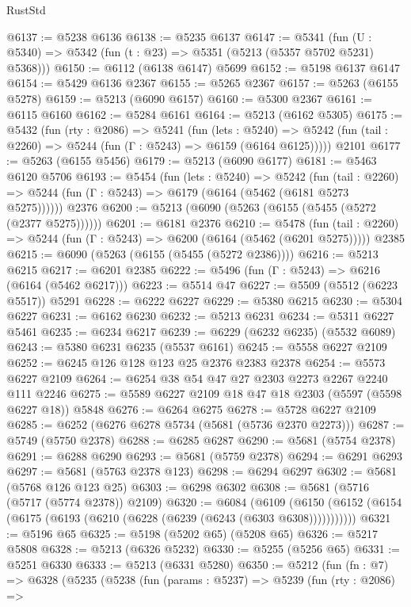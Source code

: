\begin{lexlean}{RustStd}
\begin{coremodule}
@6137 := @5238 @6136
@6138 := @5235 @6137
@6147 := @5341 (fun (U : @5340) => @5342 (fun (t : @23) => @5351 (@5213 (@5357 @5702 @5231) @5368)))
@6150 := @6112 (@6138 @6147) @5699
@6152 := @5198 @6137 @6147
@6154 := @5429 @6136 @2367
@6155 := @5265 @2367
@6157 := @5263 (@6155 @5278)
@6159 := @5213 (@6090 @6157)
@6160 := @5300 @2367
@6161 := @6115 @6160
@6162 := @5284 @6161
@6164 := @5213 (@6162 @5305)
@6175 := @5432
    (fun (rty : @2086) =>
    @5241
      (fun (lets : @5240) =>
      @5242 (fun (tail : @2260) => @5244 (fun (Γ : @5243) => @6159 (@6164 @6125)))))
    @2101
@6177 := @5263 (@6155 @5456)
@6179 := @5213 (@6090 @6177)
@6181 := @5463 @6120 @5706
@6193 := @5454
    (fun (lets : @5240) =>
    @5242
      (fun (tail : @2260) => @5244 (fun (Γ : @5243) => @6179 (@6164 (@5462 (@6181 @5273 @5275))))))
    @2376
@6200 := @5213 (@6090 (@5263 (@6155 (@5455 (@5272 (@2377 @5275))))))
@6201 := @6181 @2376
@6210 := @5478
    (fun (tail : @2260) => @5244 (fun (Γ : @5243) => @6200 (@6164 (@5462 (@6201 @5275)))))
    @2385
@6215 := @6090 (@5263 (@6155 (@5455 (@5272 @2386))))
@6216 := @5213 @6215
@6217 := @6201 @2385
@6222 := @5496 (fun (Γ : @5243) => @6216 (@6164 (@5462 @6217)))
@6223 := @5514 @47
@6227 := @5509 (@5512 (@6223 @5517)) @5291
@6228 := @6222 @6227
@6229 := @5380 @6215
@6230 := @5304 @6227
@6231 := @6162 @6230
@6232 := @5213 @6231
@6234 := @5311 @6227 @5461
@6235 := @6234 @6217
@6239 := @6229 (@6232 @6235) (@5532 @6089)
@6243 := @5380 @6231 @6235 (@5537 @6161)
@6245 := @5558 @6227 @2109
@6252 := @6245 @126 @128 @123 @25 @2376 @2383 @2378
@6254 := @5573 @6227 @2109
@6264 := @6254 @38 @54 @47 @27 @2303 @2273 @2267 @2240 @111 @2246
@6275 := @5589 @6227 @2109 @18 @47 @18 @2303 (@5597 (@5598 @6227 @18)) @5848
@6276 := @6264 @6275
@6278 := @5728 @6227 @2109
@6285 := @6252 (@6276 @6278 @5734 (@5681 (@5736 @2370 @2273)))
@6287 := @5749 (@5750 @2378)
@6288 := @6285 @6287
@6290 := @5681 (@5754 @2378)
@6291 := @6288 @6290
@6293 := @5681 (@5759 @2378)
@6294 := @6291 @6293
@6297 := @5681 (@5763 @2378 @123)
@6298 := @6294 @6297
@6302 := @5681 (@5768 @126 @123 @25)
@6303 := @6298 @6302
@6308 := @5681 (@5716 (@5717 (@5774 @2378)) @2109)
@6320 := @6084
    (@6109 (@6150 (@6152 (@6154 (@6175 (@6193 (@6210 (@6228 (@6239 (@6243 (@6303 @6308)))))))))))
@6321 := @5196 @65
@6325 := @5198 (@5202 @65) (@5208 @65)
@6326 := @5217 @5808
@6328 := @5213 (@6326 @5232)
@6330 := @5255 (@5256 @65)
@6331 := @5251 @6330
@6333 := @5213 (@6331 @5280)
@6350 := @5212
    (fun (fn : @7) =>
    @6328
      (@5235
        (@5238
          (fun (params : @5237) =>
          @5239
            (fun (rty : @2086) =>

\end{coremodule}
\end{lexlean}
